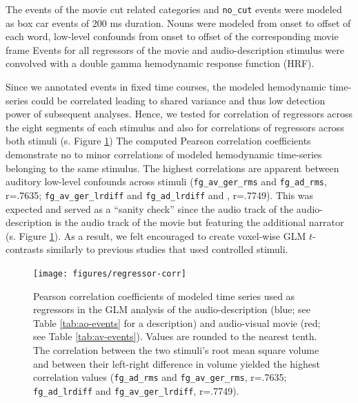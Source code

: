 \documentclass[english]{article}
\begin{document}
The events of the movie cut related categories and \texttt{no\_cut} events were
modeled as box car events of 200 ms duration.
%
Nouns were modeled from onset to offset of each word, low-level confounds from
onset to offset of the corresponding movie frame
Events for all regressors of the movie and audio-description stimulus were convolved with a double
gamma hemodynamic response function (HRF).

Since we annotated events in fixed time courses, the modeled hemodynamic
time-series could be correlated leading to shared variance and thus low
detection power of subsequent analyses.
Hence, we tested for correlation of regressors across the eight segments of each
stimulus and also for correlations of regressors across both stimuli (s. Figure
\ref{fig:reg-corr})
The computed Pearson correlation coefficients demonstrate no to minor
correlations of modeled hemodynamic time-series belonging to the same stimulus.
The highest correlations are apparent between auditory low-level confounds
across stimuli (\texttt{fg\_av\_ger\_rms} and \texttt{fg\_ad\_rms}, r=.7635;
\texttt{fg\_av\_ger\_lrdiff} and \texttt{fg\_ad\_lrdiff} and , r=.7749).
This was expected and served as a ``sanity check'' since the audio track of the
audio-description is the audio track of the movie but featuring the additional
narrator (s. Figure \ref{fig:reg-corr}).
As a result, we felt encouraged to create voxel-wise GLM $t$-contrasts similarly
to previous studies that used controlled stimuli.


\begin{figure}[h!]
\centering
    \texttt{[image: figures/regressor-corr]} \caption{Pearson
        correlation coefficients of modeled time series used as regressors in
        the GLM analysis of the
        audio-description (blue; see Table \ref{tab:ao-events} for a
        description) and audio-visual movie (red; see Table
        \ref{tab:av-events}).
        Values are rounded to the nearest tenth.
        The correlation between the two stimuli's
        root mean square volume and between their left-right difference in
        volume yielded the highest correlation values
        (\texttt{fg\_ad\_rms} and \texttt{fg\_av\_ger\_rms}, r=.7635;
        \texttt{fg\_ad\_lrdiff} and \texttt{fg\_av\_ger\_lrdiff}, r=.7749).
      }
\label{fig:reg-corr}
\end{figure}
\end{document}
